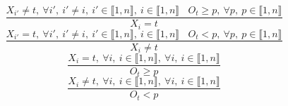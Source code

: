 $$\frac{X_{i'} \neq t,~\forall i',~i' \neq i,~i' \in \llbracket1,n\rrbracket,~i \in \llbracket1,n\rrbracket~~~~O_{t} \geq p,~\forall p,~p \in \llbracket1,n\rrbracket}{X_{i}=t}$$ $$\frac{X_{i'}=t,~\forall i',~i' \neq i,~i' \in \llbracket1,n\rrbracket,~i \in \llbracket1,n\rrbracket~~~~O_{t}<p,~\forall p,~p \in \llbracket1,n\rrbracket}{X_{i} \neq t}$$ $$\frac{X_{i}=t,~\forall i,~i \in \llbracket1,n\rrbracket,~\forall i,~i \in \llbracket1,n\rrbracket}{O_{t} \geq p}$$ $$\frac{X_{i} \neq t,~\forall i,~i \in \llbracket1,n\rrbracket,~\forall i,~i \in \llbracket1,n\rrbracket}{O_{t}<p}$$ 